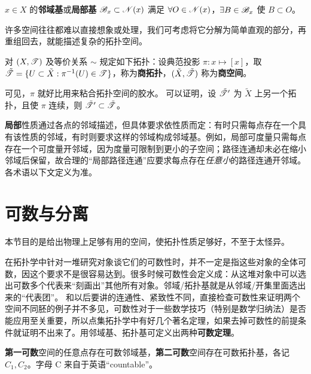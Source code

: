 \begin{definition}
    $x\in X$ 的\textbf{邻域基}或\textbf{局部基} $\mathscr B_x\subset\mathscr N(x)$ 满足 $\forall O\in\mathscr N(x)$，$\exists B\in\mathscr B_x$ 使 $B\subset O$。
\end{definition}

许多空间往往都难以直接想象或处理，我们可考虑将它分解为简单直观的部分，再重组回去，就能描述复杂的拓扑空间。

\begin{definition}
    对 $(X,\mathscr T)$ 及等价关系 $\sim$ 规定如下拓扑：设典范投影 $\pi:x\mapsto [x]$，取 $\tilde{\mathscr T}=\{U \subset \tilde X:\pi^{-1}(U)\in\mathscr T\}$，称为\textbf{商拓扑}，$(\tilde X,\tilde{\mathscr T})$ 称为\textbf{商空间}。
\end{definition}
可见，$\pi$ 就好比用来粘合拓扑空间的胶水。
可以证明，设 $\tilde{\mathscr T}^{\prime}$ 为 $\tilde X$ 上另一个拓扑，且使 $\pi$ 连续，则 $\tilde{\mathscr T}^{\prime} \subset \tilde{\mathscr T}$。

\begin{remark}
    \textbf{局部}性质通过各点的邻域描述，但具体要求依性质而定：有时只需每点存在一个具有该性质的邻域，有时则要求这样的邻域构成邻域基。例如，局部可度量只需每点存在一个可度量开邻域，因为度量可限制到更小的子空间；路径连通却未必在缩小邻域后保留，故合理的“局部路径连通”应要求每点存在\emph{任意小}的路径连通开邻域。各术语以下文定义为准。
\end{remark}

\section{可数与分离}\label{sec:countability-separation}
本节目的是给出物理上足够有用的空间，使拓扑性质足够好，不至于太怪异。

在拓扑学中针对一堆研究对象谈它们的可数性时，并不一定是指这些对象的全体可数，因这个要求不是很容易达到。很多时候可数性会定义成：从这堆对象中可以选出可数多个代表来“刻画出”其他所有对象。邻域/拓扑基就是从邻域/开集里面选出来的“代表团”。
和以后要讲的连通性、紧致性不同，直接检查可数性来证明两个空间不同胚的例子并不多见，可数性对于一些数学技巧（特别是数学归纳法）是否能应用至关重要，所以点集拓扑学中有好几个著名定理，如果去掉可数性的前提条件就证明不出来了。用邻域基、拓扑基可定义出两种\textbf{可数定理}。

\begin{definition}\textbf{第一可数}空间的任意点存在可数邻域基，\textbf{第二可数}空间存在可数拓扑基，各记 $C_1,C_2$。字母 C 来⾃于英语“countable”。
\end{definition}

